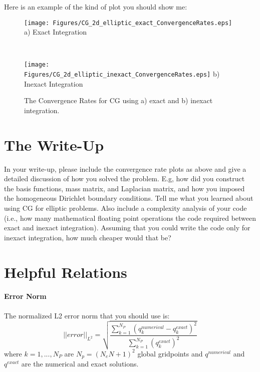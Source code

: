 \documentclass[10pt]{article}
\newcommand{\be}{\begin{equation}}
\newcommand{\ee}{\end{equation}}
\begin{document}
Here is an example of the kind of plot you should show me:
\begin{figure}[h]
\begin{center}
\begin{minipage}{2.20in}
\texttt{[image: Figures/CG\_2d\_elliptic\_exact\_ConvergenceRates.eps]}
a) Exact Integration 
\end{minipage} \ \hspace{0.125in} \
\begin{minipage}{2.20in}
\texttt{[image: Figures/CG\_2d\_elliptic\_inexact\_ConvergenceRates.eps]}
b) Inexact Integration
\end{minipage} 
\caption{The Convergence Rates for CG using a) exact and b) inexact integration.}
\end{center}
\end{figure}

\clearpage

\section{The Write-Up}
In your write-up, please include the convergence rate plots as above and give a detailed discussion of how you solved the 
problem. E.g, how did you construct the basis functions, mass matrix, and Laplacian matrix, and how you imposed the 
homogeneous Dirichlet boundary conditions. Tell me what you learned about using CG for elliptic problems. Also include a complexity analysis 
of your code (i.e., how many mathematical floating point operations the code required between exact and inexact integration). Assuming 
that you could write the code only for inexact integration, how much cheaper would that be?

\section{Helpful Relations}

\paragraph{Error Norm}
The normalized L2 error norm that you should use is:
\be
||error||_{L^2} = \sqrt{ \frac{ \sum_{k=1}^{N_P}  \left( q^{numerical}_k - q^{exact}_k \right)^2}{ \sum_{k=1}^{N_P} \left( q^{exact}_k \right) ^2} }
\ee
where $k=1,...,N_P$ are $N_p=(N_e N + 1)^2 $ global gridpoints and $q^{numerical}$ and $q^{exact}$ are the numerical and exact solutions.
\end{document}
